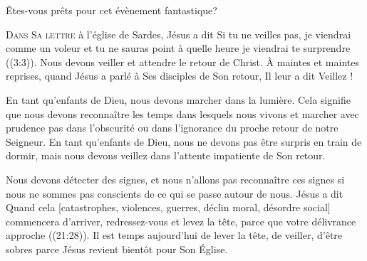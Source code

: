 Êtes-vous prêts pour cet évènement fantastique?

\dvrule






\lettrine{D}{ans Sa lettre} à l'église de Sardes,
 Jésus a dit\frcolon {}
 \Og Si tu ne veilles pas, je viendrai comme un voleur et tu ne sauras point
 à quelle heure je viendrai te surprendre \Fg{} ((3:3)).
 Nous devons veiller et attendre le retour de Christ.
 À maintes et maintes reprises, quand Jésus a parlé à Ses disciples
 de Son retour, Il leur a dit\frcolon {} \Og Veillez ! \Fg{}


En tant qu'enfants de Dieu, nous devons marcher dans la lumière.
 Cela signifie que nous devons reconnaître les temps dans lesquels nous vivons
 et marcher avec prudence \ocadr pas dans l'obscurité ou dans l'ignorance
 du proche retour de notre Seigneur. En tant qu'enfants de Dieu,
 nous ne devons pas être surpris en train de dormir,
 mais nous devons veillez dans l'attente impatiente de Son retour.

Nous devons détecter des signes, et nous n'allons pas reconnaître ces signes
 si nous ne sommes pas conscients de ce qui se passe autour de nous.
 Jésus a dit\frcolon {}
 \Og Quand cela [catastrophes, violences, guerres, déclin moral,
 désordre social] commencera d'arriver, redressez-vous et levez la tête,
 parce que votre délivrance approche \Fg{} ((21:28)).
 Il est temps aujourd'hui de lever la tête, de veiller, d'être sobres
 \ocadr parce Jésus revient bientôt pour Son Église. 

\dvrule




